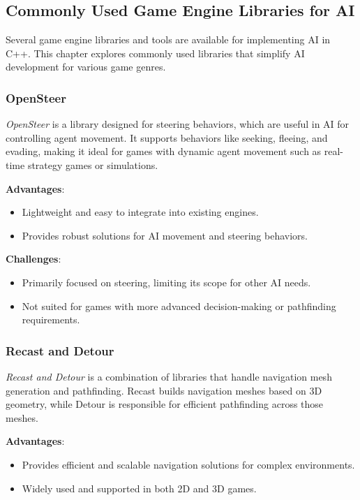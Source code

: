 \documentclass{article} %
\begin{document}
\subsection{Commonly Used Game Engine Libraries for AI}

Several game engine libraries and tools are available for implementing AI in C++. This chapter explores commonly used libraries that simplify AI development for various game genres.

\subsubsection{OpenSteer}

\textit{OpenSteer} is a library designed for steering behaviors, which are useful in AI for controlling agent movement. It supports behaviors like seeking, fleeing, and evading, making it ideal for games with dynamic agent movement such as real-time strategy games or simulations.

\textbf{Advantages}:
\begin{itemize}
	\item Lightweight and easy to integrate into existing engines.
	\item Provides robust solutions for AI movement and steering behaviors.
\end{itemize}

\textbf{Challenges}:
\begin{itemize}
	\item Primarily focused on steering, limiting its scope for other AI needs.
	\item Not suited for games with more advanced decision-making or pathfinding requirements.
\end{itemize}

\subsubsection{Recast and Detour}

\textit{Recast and Detour} is a combination of libraries that handle navigation mesh generation and pathfinding. Recast builds navigation meshes based on 3D geometry, while Detour is responsible for efficient pathfinding across those meshes.

\textbf{Advantages}:
\begin{itemize}
	\item Provides efficient and scalable navigation solutions for complex environments.
	\item Widely used and supported in both 2D and 3D games.
\end{itemize}
\end{document}

